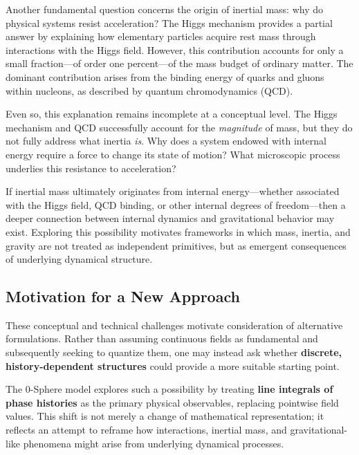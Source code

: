 \documentclass[12pt,letterpaper]{article}
\begin{document}
Another fundamental question concerns the origin of inertial mass: why do physical systems resist acceleration? The Higgs mechanism provides a partial answer by explaining how elementary particles acquire rest mass through interactions with the Higgs field. However, this contribution accounts for only a small fraction—of order one percent—of the mass budget of ordinary matter. The dominant contribution arises from the binding energy of quarks and gluons within nucleons, as described by quantum chromodynamics (QCD).

Even so, this explanation remains incomplete at a conceptual level. The Higgs mechanism and QCD successfully account for the \textit{magnitude} of mass, but they do not fully address what inertia \textit{is}. Why does a system endowed with internal energy require a force to change its state of motion? What microscopic process underlies this resistance to acceleration?

If inertial mass ultimately originates from internal energy—whether associated with the Higgs field, QCD binding, or other internal degrees of freedom—then a deeper connection between internal dynamics and gravitational behavior may exist. Exploring this possibility motivates frameworks in which mass, inertia, and gravity are not treated as independent primitives, but as emergent consequences of underlying dynamical structure.


\subsection{Motivation for a New Approach}
\label{subsec:new_approach}

These conceptual and technical challenges motivate consideration of alternative formulations. Rather than assuming continuous fields as fundamental and subsequently seeking to quantize them, one may instead ask whether \textbf{discrete, history-dependent structures} could provide a more suitable starting point.

The 0-Sphere model explores such a possibility by treating \textbf{line integrals of phase histories} as the primary physical observables, replacing pointwise field values. This shift is not merely a change of mathematical representation; it reflects an attempt to reframe how interactions, inertial mass, and gravitational-like phenomena might arise from underlying dynamical processes.
\end{document}
